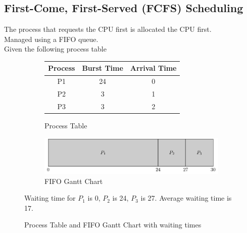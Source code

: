 \documentclass{book/custombook}
\begin{document}
            \subsection{First-Come, First-Served (FCFS) Scheduling}
                The process that requests the CPU first is allocated the CPU first.\\
                Managed using a FIFO queue.\\
                Given the following process table
                \begin{figure}[H]
                    \centering
                    \begin{subfigure}{0.5\textwidth}
                        \centering
                        \begin{tabular}{ccc}
                            Process & Burst Time & Arrival Time\\
                            \toprule
                            P1 & 24 & 0\\
                            P2 & 3  & 1\\
                            P3 & 3  & 2\\
                            \bottomrule
                        \end{tabular}
                        \caption{Process Table}
                    \end{subfigure}%
                    \begin{subfigure}{0.5\textwidth}
                        \centering
                        \includegraphics[width=\linewidth]{figures/fifo_gantt_1.pdf}
                        \caption{FIFO Gantt Chart}
                    \end{subfigure}
                    Waiting time for $P_1$ is 0, $P_2$ is 24, $P_3$ is 27. Average waiting time is 17.
                    \caption{Process Table and FIFO Gantt Chart with waiting times}
                \end{figure}
\end{document}
